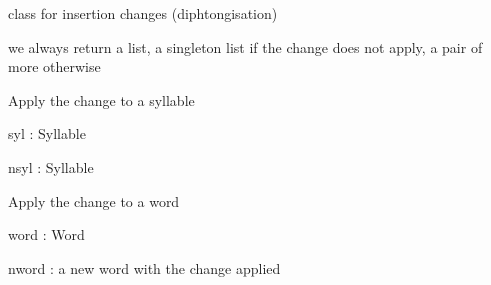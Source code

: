 \documentclass[letterpaper,10pt,english]{sphinxmanual}
\begin{document}
\begin{fulllineitems}
\label{\detokenize{index:Change.I_change}}
\sphinxAtStartPar
class for insertion changes (diphtongisation)

\begin{fulllineitems}
\label{\detokenize{index:Change.I_change.apply_phon}}
\sphinxAtStartPar
we always return a list, a singleton list if the change does not apply, a pair of more otherwise

\end{fulllineitems}


\begin{fulllineitems}
\label{\detokenize{index:Change.I_change.apply_syl}}
\sphinxAtStartPar
Apply the change to a syllable

\sphinxAtStartPar
syl : Syllable

\sphinxAtStartPar
nsyl : Syllable

\end{fulllineitems}


\begin{fulllineitems}
\label{\detokenize{index:Change.I_change.apply_word}}
\sphinxAtStartPar
Apply the change to a word

\sphinxAtStartPar
word : Word

\sphinxAtStartPar
nword : a new word with the change applied

\end{fulllineitems}



\end{fulllineitems}
\end{document}
